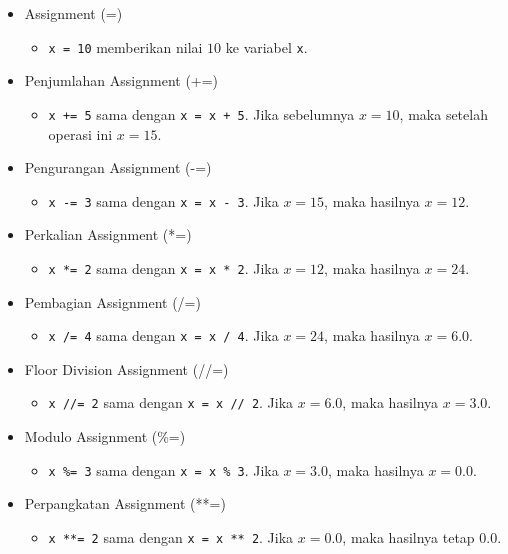 \begin{itemize}
    \item Assignment (=)
    \begin{itemize}
        \item \texttt{x = 10} memberikan nilai $10$ ke variabel \texttt{x}.
    \end{itemize}

    \item Penjumlahan Assignment (+=)
    \begin{itemize}
        \item \texttt{x += 5} sama dengan \texttt{x = x + 5}. Jika sebelumnya $x = 10$, maka setelah operasi ini $x = 15$.
    \end{itemize}

    \item Pengurangan Assignment (-=)
    \begin{itemize}
        \item \texttt{x -= 3} sama dengan \texttt{x = x - 3}. Jika $x = 15$, maka hasilnya $x = 12$.
    \end{itemize}

    \item Perkalian Assignment (*=)
    \begin{itemize}
        \item \texttt{x *= 2} sama dengan \texttt{x = x * 2}. Jika $x = 12$, maka hasilnya $x = 24$.
    \end{itemize}

    \item Pembagian Assignment (/=)
    \begin{itemize}
        \item \texttt{x /= 4} sama dengan \texttt{x = x / 4}. Jika $x = 24$, maka hasilnya $x = 6.0$.
    \end{itemize}

    \item Floor Division Assignment (//=)
    \begin{itemize}
        \item \texttt{x //= 2} sama dengan \texttt{x = x // 2}. Jika $x = 6.0$, maka hasilnya $x = 3.0$.
    \end{itemize}

    \item Modulo Assignment (\%=)
    \begin{itemize}
        \item \texttt{x \%= 3} sama dengan \texttt{x = x \% 3}. Jika $x = 3.0$, maka hasilnya $x = 0.0$.
    \end{itemize}

    \item Perpangkatan Assignment (**=)
    \begin{itemize}
        \item \texttt{x **= 2} sama dengan \texttt{x = x ** 2}. Jika $x = 0.0$, maka hasilnya tetap $0.0$.
    \end{itemize}
\end{itemize}

